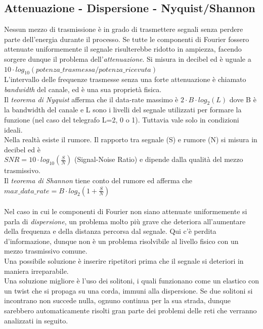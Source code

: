 \documentclass[10pt,a4paper,twoside]{article}
\begin{document}
\subsection{Attenuazione - Dispersione - Nyquist/Shannon}
Nessun mezzo di trasmissione è in grado di trasmettere segnali senza perdere parte dell'energia durante il processo. Se tutte le componenti di Fourier fossero attenuate uniformemente il segnale risulterebbe ridotto in ampiezza, facendo sorgere dunque il problema 
dell'\textit{attenuazione}.
Si misura in decibel ed è uguale a $10\cdot log_{10}(potenza\_trasmessa/potenza\_ricevuta)$\\
L'intervallo delle frequenze trasmesse senza una forte attenuazione è chiamato \textit{bandwidth} del canale, ed è una sua proprietà fisica.\\
Il \textit{teorema di Nyquist} afferma che il data-rate massimo è $2\cdot B\cdot log_2(L)$ dove B è la bandwidth del canale e L sono i livelli del segnale utilizzati per formare la funzione (nel caso del telegrafo L=2, 0 o 1). Tuttavia vale solo in condizioni ideali.\\
Nella realtà esiste il rumore. Il rapporto tra segnale (S) e rumore (N) si misura in decibel ed è\\$SNR=10\cdot log_{10}(\frac{S}{N})$ (Signal-Noise Ratio) e dipende dalla qualità del mezzo trasmissivo.\\
Il \textit{teorema di Shannon} tiene conto del rumore ed afferma che $max\_data\_rate=B\cdot log_2(1+\frac{S}{N})$\\\\
Nel caso in cui le componenti di Fourier non siano attenuate uniformemente si parla di \textit{dispersione}, un problema molto più grave che deteriora all'aumentare della frequenza e della distanza percorsa dal segnale. Qui c'è perdita d'informazione, dunque non è un problema risolvibile al livello fisico con un mezzo trasmissivo comune.\\
Una possibile soluzione è inserire ripetitori prima che il segnale si deteriori in maniera irreparabile.\\
Una soluzione migliore è l'uso dei solitoni, i quali funzionano come un elastico con un twist che si propaga su una corda, immuni alla dispersione. Se due solitoni si incontrano non succede nulla, ognuno continua per la sua strada, dunque sarebbero automaticamente risolti gran parte dei problemi delle reti che verranno analizzati in seguito.
\end{document}
